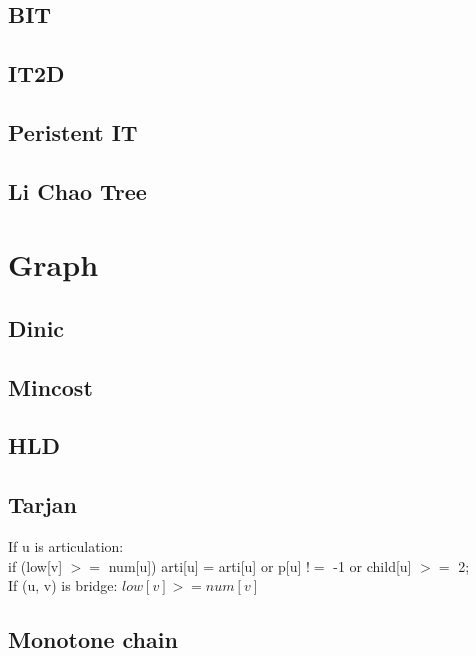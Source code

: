 \documentclass[A4 paper, 12pt, oneside, landscape]{article}
\begin{document}
\begin{multicols}{2}
	\subsection{BIT}
	
	
	\subsection{IT2D}
	
	
	\subsection{Peristent IT}
	
	
	\subsection{Li Chao Tree}
	

\section{Graph}
	\subsection{Dinic}
	

	\subsection{Mincost}
	
	
	\subsection{HLD}
	
	
	\subsection{Tarjan}
If u is articulation: \\
if (low[v] $>=$ num[u]) arti[u] = arti[u] or p[u] $!=$ -1 or child[u] $>=$ 2; \\
If (u, v) is bridge: $low[v] >= num[v]$
	\subsection{Monotone chain}
	


\end{multicols}
\end{document}
